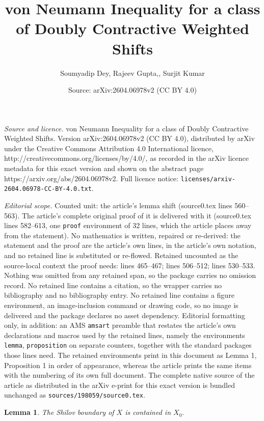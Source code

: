 \documentclass[10pt,a4paper]{amsart}
\title{von Neumann Inequality for a class of Doubly Contractive Weighted Shifts}
\author{Soumyadip Dey, Rajeev Gupta,, Surjit Kumar}
\date{Source: arXiv:2604.06978v2 (CC BY 4.0)}
\newtheorem{lemma}{Lemma}
\begin{document}
\maketitle

\noindent\emph{Source and licence.} von Neumann Inequality for a class of Doubly Contractive Weighted Shifts. Version arXiv:2604.06978v2 (CC BY 4.0), distributed by arXiv under the Creative Commons Attribution 4.0 International licence, http://creativecommons.org/licenses/by/4.0/, as recorded in the arXiv licence metadata for this exact version and shown on the abstract page https://arxiv.org/abs/2604.06978v2. Full licence notice: \texttt{licenses/arxiv-2604.06978-CC-BY-4.0.txt}.\par\smallskip

\noindent\textit{Editorial scope.} Counted unit: the article's lemma shift (source0.tex lines 560--563). The article's complete original proof of it is delivered with it (source0.tex lines 582--613, one \texttt{proof} environment of 32 lines, which the article places away from the statement). No mathematics is written, repaired or re-derived: the statement and the proof are the article's own lines, in the article's own notation, and no retained line is substituted or re-flowed.  Retained uncounted as the source-local context the proof needs: lines 465--467; lines 506--512; lines 530--533.  Nothing was omitted from any retained span, so the package carries no omission record.  No retained line contains a citation, so the wrapper carries no bibliography and no bibliography entry.  No retained line contains a figure environment, an image-inclusion command or drawing code, so no image is delivered and the package declares no asset dependency.  Editorial formatting only, in addition: an AMS \texttt{amsart} preamble that restates the article's own declarations and macros used by the retained lines, namely the environments \texttt{lemma}, \texttt{proposition} on separate counters, together with the standard packages those lines need.  The retained environments print in this document as Lemma 1, Proposition 1 in order of appearance, whereas the article prints the same items with the numbering of its own full document.  The complete native source of the article as distributed in the arXiv e-print for this exact version is bundled unchanged as \texttt{sources/198059/source0.tex}.
\begin{lemma}\label{Shilov}
The Shilov boundary of \( X \) is contained in $X_0.$
\end{lemma}
\end{document}
